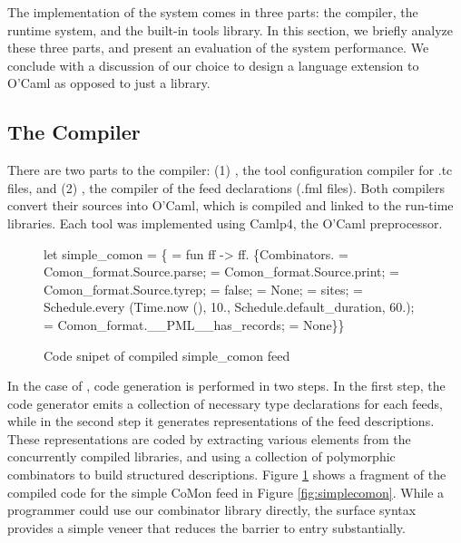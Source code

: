 The implementation of the \padsd{} system comes in
three parts: the compiler, the runtime system, and the
built-in tools library. In this section, we briefly
analyze these three parts, and present 
an evaluation of the system performance.  We conclude
with a discussion of our choice to design a language
extension to O'Caml as opposed to just a library.

\subsection{The Compiler}
There are two parts to the \padsd{} compiler:
(1) , the tool configuration compiler for .tc files, 
and (2) , the
compiler of the feed declarations (.fml files). Both compilers
convert their sources into O'Caml, which is compiled and
linked to the run-time libraries.  Each tool was implemented using 
Camlp4, the O'Caml preprocessor. 

\begin{figure}[t]
\centering
\begin{codebox}
let simple_comon =
\{ = fun ff ->
 ff.
 \{Combinators. = Comon_format.Source.parse;
   = Comon_format.Source.print;
   = Comon_format.Source.tyrep; 
   = false;
   = None; 
   = sites;
   =
    Schedule.{\kw every} (Time.now (), 10., 
                    Schedule.default_duration, 60.);
   = Comon_format.__PML__has_records; 
   = None\}\}
\end{codebox}
\caption{Code snipet of compiled simple\_comon feed}\label{fig:compiledcomon}
\end{figure}

In the case of , code generation is performed in two steps.
In the first step, the code generator emits a collection of
necessary type declarations for each feeds, while in the second step
it generates representations of the feed descriptions.  These representations
are coded by extracting various elements from the concurrently
compiled \padsml{} libraries,
and using a collection of polymorphic combinators to build structured 
descriptions.  Figure \ref{fig:compiledcomon} shows a fragment of
the compiled code for
the simple CoMon feed in Figure \ref{fig:simplecomon}.
While a programmer could use our combinator library directly, the
surface syntax provides a simple veneer that reduces the barrier to
entry substantially.

